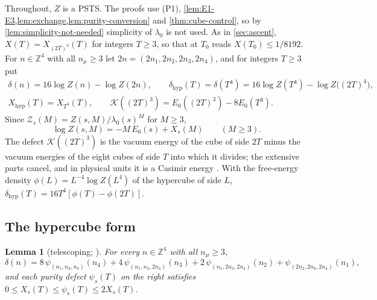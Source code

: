 \documentclass[11pt,a4paper]{amsart}
\newtheorem{lemma}[theorem]{Lemma}
\theoremstyle{definition}
\theoremstyle{remark}
\numberwithin{equation}{section}
\newcommand{\Z}{\mathbb{Z}}          %
\newcommand{\PSTS}{\textup{PSTS}}          %
\newcommand{\TT}{\mathbb{T}}               %
\newcommand{\Zpart}[2]{Z(#1,#2)}           %
\newcommand{\Zc}{\mathcal{Z}}              %
\newcommand{\Zs}[2]{\Zc_{#1}(#2)}          %
\newcommand{\XT}[2]{X_{#1}(#2)}            %
\newcommand{\psiT}[2]{\psi_{#1}(#2)}       %
\newcommand{\cube}[1]{(2#1)^3}             %
\newcommand{\lzero}{\lambda_0}             %
\newcommand{\xconst}{\frac{1}{8192}}       %
\newcommand{\xconstinl}{1/8192}            %
\newcommand{\Bcirc}{\text{\upshape(B$^{\circ}$)}}   %
\begin{document}
Throughout, $Z$ is a \PSTS{}. The proofs use (P1), \cref{lem:E1-E3,lem:exchange,lem:purity-conversion} and \cref{thm:cube-control}, so by \cref{lem:simplicity-not-needed} simplicity of $\lzero$ is not used. As in \cref{sec:ascent}, $X(T)=\XT{\cube{T}}{T}$ for integers $T\ge3$, so that \Bcirc{} at $T_0$ reads $X(T_0)\le\xconstinl$. For $n\in\Z^4$ with all $n_\mu\ge3$ let $2n=(2n_1,2n_2,2n_3,2n_4)$, and for integers $T\ge3$ put
\begin{equation}\label{eq:criteria-notation}
\begin{gathered}
\delta(n)=16\log Z(n)-\log Z(2n),\qquad \delta_{\mathrm{hyp}}(T)=\delta(T^4)=16\log Z(T^4)-\log Z\bigl((2T)^4\bigr),\\
X_{\mathrm{hyp}}(T)=\XT{T^3}{T},\qquad \mathcal K(\cube{T})=E_0(\cube{T})-8E_0(T^3).
\end{gathered}
\end{equation}
Since $\Zs{s}{M}=\Zpart{s}{M}/\lzero(s)^M$ for $M\ge3$,
\begin{equation}\label{eq:logZ-split}
\log\Zpart{s}{M}=-M\,E_0(s)+\XT{s}{M}\qquad(M\ge3).
\end{equation}
The defect $\mathcal K(\cube{T})$ is the vacuum energy of the cube of side $2T$ minus the vacuum energies of the eight cubes of side $T$ into which it divides; the extensive parts cancel, and in physical units it is a Casimir energy \cite[Proposition~13]{bhattacharjee2026first}. With the free-energy density $\phi(L)=L^{-4}\log Z(L^4)$ of the hypercube of side $L$, $\delta_{\mathrm{hyp}}(T)=16T^4[\phi(T)-\phi(2T)]$.

\subsection{The hypercube form}

\begin{lemma}[{telescoping; \cite[proof of Proposition~16(ii)]{bhattacharjee2026first}}]\label{lem:telescoping}
For every $n\in\Z^4$ with all $n_\mu\ge3$,
\begin{equation}\label{eq:telescoping}
\delta(n)=8\,\psiT{(n_1,n_2,n_3)}{n_4}+4\,\psiT{(n_1,n_2,2n_4)}{n_3}+2\,\psiT{(n_1,2n_3,2n_4)}{n_2}+\psiT{(2n_2,2n_3,2n_4)}{n_1},
\end{equation}
and each purity defect $\psiT{s}{T}$ on the right satisfies $0\le\XT{s}{T}\le\psiT{s}{T}\le2\XT{s}{T}$.
\end{lemma}
\end{document}
